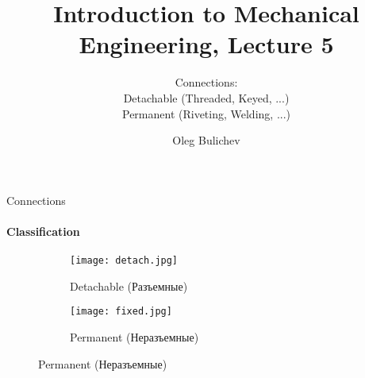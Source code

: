 \documentclass[aspectratio=169]{beamer}
\title[IME]{Introduction to Mechanical Engineering, Lecture 5} %
\subtitle{Connections:
\\ Detachable (Threaded, Keyed, ...) \\   
Permanent (Riveting, Welding, ...)} %
\author{Oleg Bulichev}
\newcommand{\fbckg}[1]{\usebackgroundtemplate{\texttt{[image: \#1]}}}%
\begin{document}
\setlength{\abovedisplayskip}{0pt}
\setlength{\belowdisplayskip}{0pt}
\setlength{\abovedisplayshortskip}{0pt}
\setlength{\belowdisplayshortskip}{0pt}

\fbckg{fibeamer/figs/title_page.png}

\fbckg{fibeamer/figs/common.png}

\note{\scriptsize \begin{itemize}
        \item \
    \end{itemize}}

\begin{frame}[t]{Connections}
    \framesubtitle{Classification}
    \vspace{-0.7cm}
    \begin{figure}[H]
        \begin{subfigure}{0.48\textwidth}
            \centering\texttt{[image: detach.jpg]}
            \caption*{Detachable (Разъемные)}
            \label{fig:detach.jpg}
        \end{subfigure}
        \begin{subfigure}{0.48\textwidth}
            \centering\texttt{[image: fixed.jpg]}
            \caption*{Permanent (Неразъемные)}
            \label{fig:fixed.jpg}
        \end{subfigure}
    \end{figure}
\end{frame}
\end{document}
